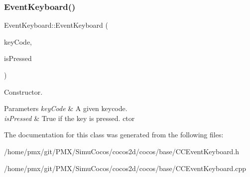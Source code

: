 \subsubsection{\texorpdfstring{Event\+Keyboard()}{EventKeyboard()}\hspace{0.1cm}{\footnotesize\ttfamily [2/2]}}
{\footnotesize\ttfamily Event\+Keyboard\+::\+Event\+Keyboard (\begin{DoxyParamCaption}\item[{\hyperlink{classEventKeyboard_a7cd3fa46515673276ce8ec7f0e051606}{Key\+Code}}]{key\+Code,  }\item[{bool}]{is\+Pressed }\end{DoxyParamCaption})}

Constructor.


\begin{DoxyParams}{Parameters}
{\em key\+Code} & A given keycode. \\
\hline
{\em is\+Pressed} & True if the key is pressed.  ctor \\
\hline
\end{DoxyParams}


The documentation for this class was generated from the following files\+:\begin{DoxyCompactItemize}
\item 
/home/pmx/git/\+P\+M\+X/\+Simu\+Cocos/cocos2d/cocos/base/C\+C\+Event\+Keyboard.\+h\item 
/home/pmx/git/\+P\+M\+X/\+Simu\+Cocos/cocos2d/cocos/base/C\+C\+Event\+Keyboard.\+cpp\end{DoxyCompactItemize}
